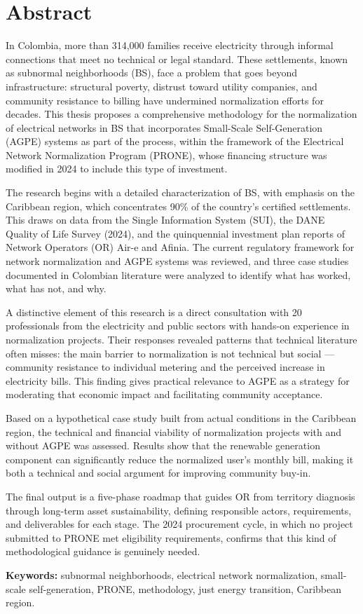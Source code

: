 
\chapter*{Abstract}

In Colombia, more than 314,000 families receive electricity through informal connections that meet no technical or legal standard. These settlements, known as subnormal neighborhoods (BS), face a problem that goes beyond infrastructure: structural poverty, distrust toward utility companies, and community resistance to billing have undermined normalization efforts for decades. This thesis proposes a comprehensive methodology for the normalization of electrical networks in BS that incorporates Small-Scale Self-Generation (AGPE) systems as part of the process, within the framework of the Electrical Network Normalization Program (PRONE), whose financing structure was modified in 2024 to include this type of investment.

The research begins with a detailed characterization of BS, with emphasis on the Caribbean region, which concentrates 90\% of the country's certified settlements. This draws on data from the Single Information System (SUI), the DANE Quality of Life Survey (2024), and the quinquennial investment plan reports of Network Operators (OR) Air-e and Afinia. The current regulatory framework for network normalization and AGPE systems was reviewed, and three case studies documented in Colombian literature were analyzed to identify what has worked, what has not, and why.

A distinctive element of this research is a direct consultation with 20 professionals from the electricity and public sectors with hands-on experience in normalization projects. Their responses revealed patterns that technical literature often misses: the main barrier to normalization is not technical but social — community resistance to individual metering and the perceived increase in electricity bills. This finding gives practical relevance to AGPE as a strategy for moderating that economic impact and facilitating community acceptance.

Based on a hypothetical case study built from actual conditions in the Caribbean region, the technical and financial viability of normalization projects with and without AGPE was assessed. Results show that the renewable generation component can significantly reduce the normalized user's monthly bill, making it both a technical and social argument for improving community buy-in.

The final output is a five-phase roadmap that guides OR from territory diagnosis through long-term asset sustainability, defining responsible actors, requirements, and deliverables for each stage. The 2024 procurement cycle, in which no project submitted to PRONE met eligibility requirements, confirms that this kind of methodological guidance is genuinely needed.

\bigskip
\noindent\textbf{Keywords:} subnormal neighborhoods, electrical network normalization, small-scale self-generation, PRONE, methodology, just energy transition, Caribbean region.